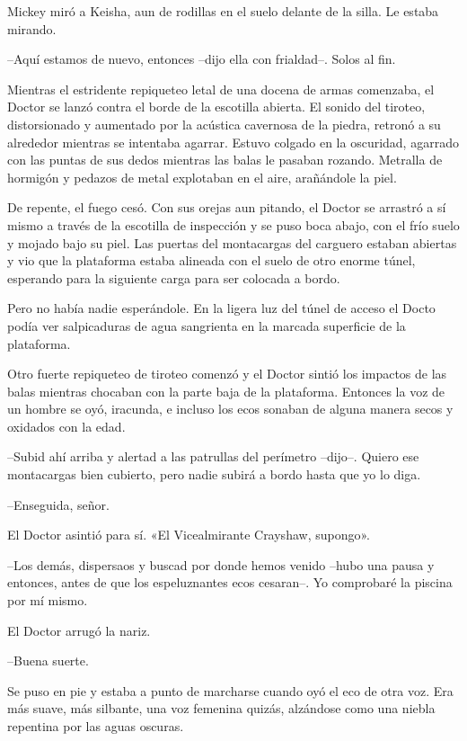 {Mickey miró a Keisha, aun de rodillas en el suelo delante de la silla.
Le estaba mirando.}

{--Aquí estamos de nuevo, entonces --dijo ella con frialdad--. Solos al
fin.}

\mbox{}

{Mientras el estridente repiqueteo letal de una docena de armas
 comenzaba, el Doctor se lanzó contra el borde de la escotilla abierta.
 El sonido del tiroteo, distorsionado y aumentado por la acústica
 cavernosa de la piedra, retronó a su alrededor mientras se intentaba
 agarrar. Estuvo colgado en la oscuridad, agarrado con las puntas de sus
 dedos mientras las balas le pasaban rozando. Metralla de hormigón y
pedazos de metal explotaban en el aire, arañándole la piel.}

{De repente, el fuego cesó. Con sus orejas aun pitando, el Doctor se
 arrastró a sí mismo a través de la escotilla de inspección y se puso
 boca abajo, con el frío suelo y mojado bajo su piel. Las puertas del
 montacargas del carguero estaban abiertas y vio que la plataforma estaba
 alineada con el suelo de otro enorme túnel, esperando para la siguiente
carga para ser colocada a bordo.}

{Pero no había nadie esperándole. En la ligera luz del túnel de acceso
 el Docto podía ver salpicaduras de agua sangrienta en la marcada
superficie de la plataforma.}

{Otro fuerte repiqueteo de tiroteo comenzó y el Doctor sintió los
 impactos de las balas mientras chocaban con la parte baja de la
 plataforma. Entonces la voz de un hombre se oyó, iracunda, e incluso los
ecos sonaban de alguna manera secos y oxidados con la edad.}

{--Subid ahí arriba y alertad a las patrullas del perímetro --dijo--.
 Quiero ese montacargas bien cubierto, pero nadie subirá a bordo hasta
que yo lo diga.}

{--Enseguida, señor.}

{El Doctor asintió para sí. «El Vicealmirante Crayshaw, supongo».}

{--Los demás, dispersaos y buscad por donde hemos venido --hubo una
 pausa y entonces, antes de que los espeluznantes ecos cesaran--. Yo
comprobaré la piscina por mí mismo.}

{El Doctor arrugó la nariz.}

{--Buena suerte.}

{Se puso en pie y estaba a punto de marcharse cuando oyó el eco de otra
 voz. Era más suave, más silbante, una voz femenina quizás, alzándose
como una niebla repentina por las aguas oscuras.}

